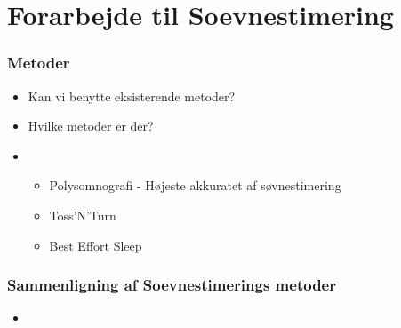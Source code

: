 \section{Forarbejde til Soevnestimering}
\begin{frame}
\frametitle{Metoder}
	\begin{itemize}
	\item Kan vi benytte eksisterende metoder?
	\item Hvilke metoder er der?
	\item{\begin{itemize}
		\item Polysomnografi - Højeste akkuratet af søvnestimering
		\item Toss'N'Turn
		\item Best Effort Sleep
		 \end{itemize}}
	\end{itemize}
\end{frame}

\begin{frame}
\frametitle{Sammenligning af Soevnestimerings metoder}
	\begin{itemize}
	\item 
	\end{itemize}
\end{frame}

